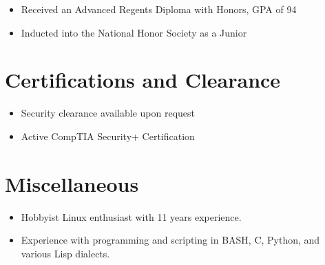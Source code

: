 \documentclass[11pt]{resume}
\begin{document}

\begin{itemize}
\item Received an Advanced Regents Diploma with Honors, GPA of 94
\item Inducted into the National Honor Society as a Junior
\end{itemize}

\section{Certifications and Clearance}
\begin{itemize}
\item Security clearance available upon request
\item Active CompTIA Security+ Certification
\end{itemize}

\section{Miscellaneous}
\begin{itemize}
\item Hobbyist Linux enthusiast with 11 years experience.
\item Experience with programming and scripting in BASH, C, Python, and various Lisp dialects.
\end{itemize}
\end{document}
